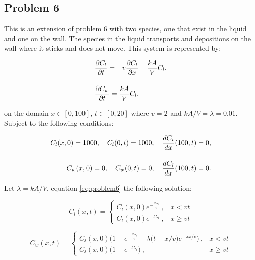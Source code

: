 \clearpage

\subsection{Problem 6}
This is an extension of problem 6 with two species, one that exist in the liquid and one on the wall. The species in the liquid transports and depositions on the wall where it sticks and does not move. This system is represented by:

\begin{equation}
\setlength{\jot}{15pt}
\begin{split}
    &\frac{\partial C_{l}}{\partial t} = -v\frac{\partial C_{l}}{\partial x} - \frac{kA}{V} C_{l}, \\
    &\frac{\partial C_{w}}{\partial t} = \frac{kA}{V} C_{l},
    \label{eq:problem6}
\end{split}
\end{equation}

\noindent on the domain $x \in [0,100]$, $t \in [0, 20]$ where $v = 2$ and $kA/V = \lambda = 0.01$. Subject to the following conditions:

\begin{equation}
\setlength{\jot}{15pt}
\begin{split}
    C_{l}(x, 0) = 1000, \quad C_{l}(0,t) = 1000, \quad \frac{dC_{l}}{dx}(100, t) = 0, \\
    C_{w}(x, 0) = 0, \quad C_{w}(0,t) = 0, \quad \frac{dC_{l}}{dx}(100, t) = 0. \\
\end{split}
\end{equation}

\noindent Let $\lambda = kA/V$, equation \ref{eq:problem6} the following solution:

\begin{equation}
C_{l} (x,t) = \begin{cases}
  C_{l} (x, 0) e^{-\frac{x \lambda _i}{v}}\ , & x < vt \\
  C_{l} (x, 0) e^{-t \lambda _i}\ , & x \ge vt
\end{cases}
\end{equation}

\begin{equation}
C_{w} (x,t) = \begin{cases}
  C_{l} (x, 0) \Big( 1 - e^{-\frac{x \lambda _i}{v}} + \lambda \big(t - x/v\big)e^{-\lambda x/v} \Big)\ , & x < vt \\
  C_{l} (x, 0) \Big( 1 - e^{-t \lambda _i}\Big)\ , & x \ge vt
\end{cases}
\end{equation}

